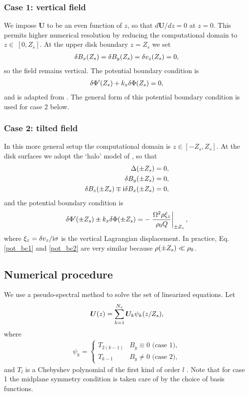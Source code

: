 \subsubsection{Case 1: vertical field}
We impose $\bm{U}$ to be an even function of $z$, so that
$d\bm{U}/dz=0$ at $z=0$. This permits higher numerical resolution by
reducing the computational domain to $z\in~[0,Z_s]$.  
At the upper disk boundary $z=Z_s$ we set 
\begin{align}
  \delta B_x(Z_s) = \delta B_y(Z_s) = \delta v_z (Z_s) = 0, 
\end{align}
so the field remains vertical. The potential boundary
condition is 
\begin{align}
  \delta \Phi^\prime(Z_s) + k_x\delta \Phi(Z_s) = 0 \label{pot_bc1},
\end{align}
and is adapted from \cite{goldreich65a}. The general form of this
potential boundary condition is used for case 2 below. 

\subsubsection{Case 2: tilted field} 
In this more general setup the computational domain is
$z\in[-Z_s, Z_s]$. At the disk surfaces we adopt the `halo' model of
\cite{gammie94}, so that
\begin{align}
  \Delta(\pm Z_s) & = 0, \\
  \delta B_y(\pm Z_s) & = 0,\\
  \delta B_z(\pm Z_s) \mp \mathrm{i} \delta B_x(\pm Z_s) &= 0,
\end{align}
and the potential boundary condition is 
\begin{align}
  \delta \Phi^\prime(\pm Z_s) \pm k_x\delta \Phi(\pm Z_s) =  - \left. \frac{\Omega^2
    \rho \xi_z}{\rho_0Q}\right|_{\pm Z_s}, \label{pot_bc2}
\end{align}
where $\xi_z=\delta v_z/\mathrm{i}\sigma$ is the vertical Lagrangian
displacement. In practice,  Eq. \ref{pot_bc1} and \ref{pot_bc2} are
very similar because $\rho(\pm Z_s)\ll\rho_0$. 



\subsection{Numerical procedure}
We use a pseudo-spectral method to solve the set of linearized
equations. Let
\begin{align}\label{cheby_expand}
  \bm{U}(z) 
  = \sum_{k=1}^{N_z} \bm{U}_k\psi_k(z/Z_s), 
\end{align}
where 
\begin{align}
  \psi_k  = 
  \begin{cases}
    T_{2(k-1)} & B_y \equiv 0 \text{ (case 1)},\\
    T_{k-1}   & B_y\neq 0 \text{ (case 2)},
  \end{cases}
\end{align}
and  $T_l$ is a Chebyshev polynomial of the first kind of order $l$
\citep{stegun65}. Note that for case 1 the midplane symmetry condition
is taken care of by the choice of basis functions. 

